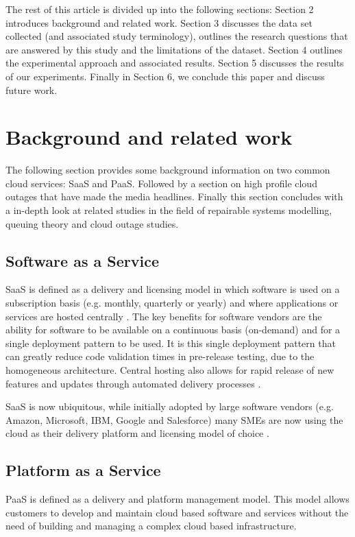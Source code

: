 \documentclass[5p]{elsarticle}
\begin{document}
The rest of this article is divided up into the following sections: Section 2 introduces background and related work. Section 3 discusses the data set collected (and associated study terminology), outlines the research questions that are answered by this study and the limitations of the dataset. Section 4 outlines the experimental approach and associated results. Section 5 discusses the results of our experiments. Finally in Section 6, we conclude this paper and discuss future work.

\section{Background and related work}

The following section provides some background information on two common cloud services: SaaS and PaaS. Followed by a section on high profile cloud outages that have made the media headlines. Finally this section concludes with a in-depth look at related studies in the field of repairable systems modelling, queuing theory and cloud outage studies.

\subsection{Software as a Service}
SaaS is defined as a delivery and licensing model in which software is used on a subscription basis (e.g. monthly, quarterly or yearly) and where applications or services are hosted centrally \cite{cloudbook2015}. The key benefits for software vendors are the ability for software to be available on a continuous basis (on-demand) and for a single deployment pattern to be used. It is this single deployment pattern that can greatly reduce code validation times in pre-release testing, due to the homogeneous architecture. Central hosting also allows for rapid release of new features and updates through automated delivery processes \cite{datacentre2015}. 

SaaS is now ubiquitous, while initially adopted by large software vendors (e.g. Amazon, Microsoft, IBM, Google and Salesforce) many SMEs are now using the cloud as their delivery platform and licensing model of choice \cite{CRN2015providers}. 

\subsection{Platform as a Service}
PaaS is defined as a delivery and platform management model. This model allows customers to develop and maintain cloud based software and services without the need of building and managing a complex cloud based infrastructure.
\end{document}
